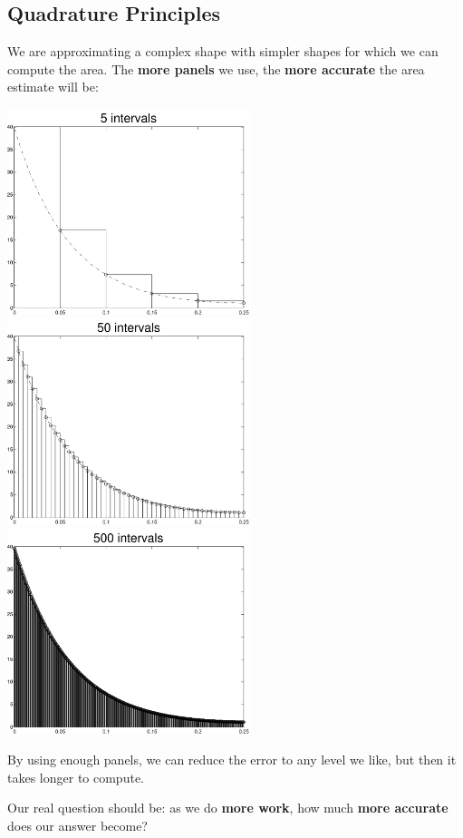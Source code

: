 \subsection*{Quadrature Principles}
We are approximating a complex shape with simpler shapes for which we
can compute the area. The {\bf more panels} we use, the {\bf more
  accurate} the area estimate will be:
\begin{center}
\includegraphics[height=6cm]{graphics/notes_06_f_lhr_5_intervals}
\includegraphics[height=6cm]{graphics/notes_06_f_lhr_50_intervals}
\includegraphics[height=6cm]{graphics/notes_06_f_lhr_500_intervals}
\end{center}
By using enough panels, we can reduce the error to any level we like,
but then it takes longer to compute.

Our real question should be: as we do {\bf more work}, how much {\bf
  more accurate} does our answer become?

